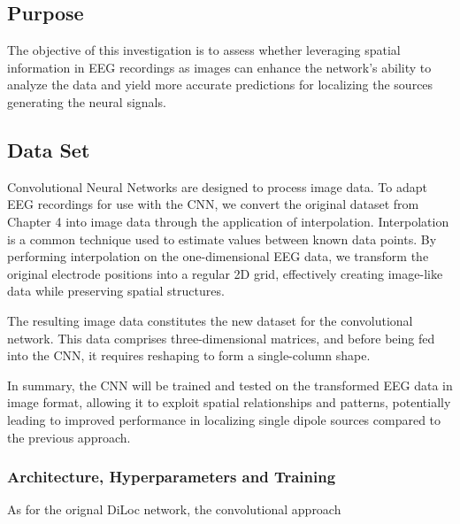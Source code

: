 \documentclass[a4paper, UKenglish, 11pt]{uiomaster}
\begin{document}
\subsection{Purpose}

The objective of this investigation is to assess whether leveraging spatial information in EEG recordings as images can enhance the network's ability to analyze the data and yield more accurate predictions for localizing the sources generating the neural signals.

\subsection{Data Set}

Convolutional Neural Networks are designed to process image data. To adapt EEG recordings for use with the CNN, we convert the original dataset from Chapter 4 into image data through the application of interpolation. Interpolation is a common technique used to estimate values between known data points. By performing interpolation on the one-dimensional EEG data, we transform the original electrode positions into a regular 2D grid, effectively creating image-like data while preserving spatial structures.

The resulting image data constitutes the new dataset for the convolutional network. This data comprises three-dimensional matrices, and before being fed into the CNN, it requires reshaping to form a single-column shape.

In summary, the CNN will be trained and tested on the transformed EEG data in image format, allowing it to exploit spatial relationships and patterns, potentially leading to improved performance in localizing single dipole sources compared to the previous approach.


\subsubsection{Architecture, Hyperparameters and Training}
As for the orignal DiLoc network, the convolutional approach
\end{document}
